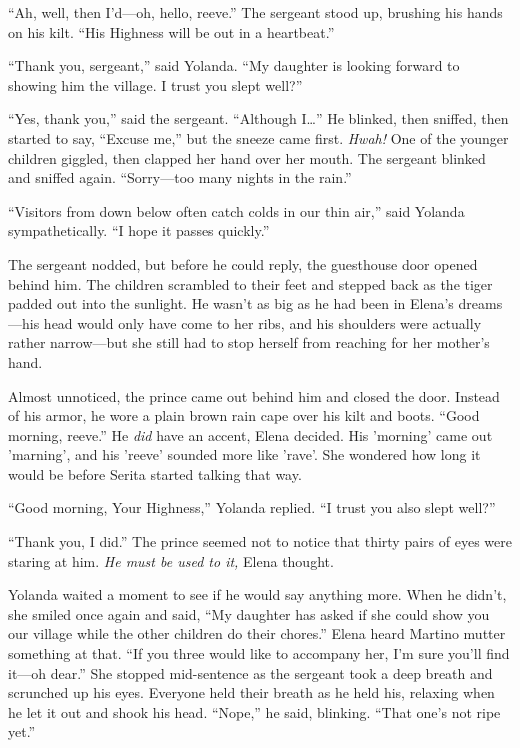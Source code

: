 \documentclass[10pt]{book}
\begin{document}
``Ah, well, then I'd---oh, hello, reeve.'' The sergeant stood up, brushing his hands on his kilt. ``His Highness will be out in a heartbeat.''

``Thank you, sergeant,'' said Yolanda. ``My daughter is looking forward to showing him the village. I trust you slept well?''

``Yes, thank you,'' said the sergeant. ``Although I{\ldots}'' He blinked, then sniffed, then started to say, ``Excuse me,'' but the sneeze came first. \emph{Hwah!} One of the younger children giggled, then clapped her hand over her mouth. The sergeant blinked and sniffed again. ``Sorry---too many nights in the rain.''

``Visitors from down below often catch colds in our thin air,'' said Yolanda sympathetically. ``I hope it passes quickly.''

The sergeant nodded, but before he could reply, the guesthouse door opened behind him. The children scrambled to their feet and stepped back as the tiger padded out into the sunlight. He wasn't as big as he had been in Elena's dreams---his head would only have come to her ribs, and his shoulders were actually rather narrow---but she still had to stop herself from reaching for her mother's hand.

Almost unnoticed, the prince came out behind him and closed the door. Instead of his armor, he wore a plain brown rain cape over his kilt and boots. ``Good morning, reeve.'' He \emph{did} have an accent, Elena decided. His 'morning' came out 'marning', and his 'reeve' sounded more like 'rave'. She wondered how long it would be before Serita started talking that way.

``Good morning, Your Highness,'' Yolanda replied. ``I trust you also slept well?''

``Thank you, I did.'' The prince seemed not to notice that thirty pairs of eyes were staring at him. \emph{He must be used to it,} Elena thought.

Yolanda waited a moment to see if he would say anything more. When he didn't, she smiled once again and said, ``My daughter has asked if she could show you our village while the other children do their chores.'' Elena heard Martino mutter something at that. ``If you three would like to accompany her, I'm sure you'll find it---oh dear.'' She stopped mid-sentence as the sergeant took a deep breath and scrunched up his eyes. Everyone held their breath as he held his, relaxing when he let it out and shook his head. ``Nope,'' he said, blinking. ``That one's not ripe yet.''
\end{document}
